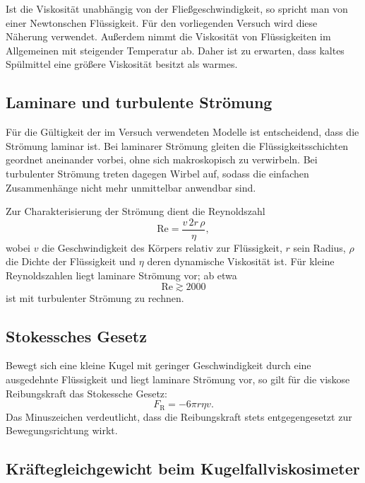 \documentclass{report}
\begin{document}
\noindent
Ist die Viskosität unabhängig von der Fließgeschwindigkeit, so spricht man von einer
Newtonschen Flüssigkeit. Für den vorliegenden Versuch wird diese Näherung verwendet.
Außerdem nimmt die Viskosität von Flüssigkeiten im Allgemeinen mit steigender Temperatur ab.
Daher ist zu erwarten, dass kaltes Spülmittel eine größere Viskosität besitzt als warmes.

\subsection{Laminare und turbulente Strömung}

Für die Gültigkeit der im Versuch verwendeten Modelle ist entscheidend, dass die Strömung
laminar ist. Bei laminarer Strömung gleiten die Flüssigkeitsschichten geordnet aneinander
vorbei, ohne sich makroskopisch zu verwirbeln. Bei turbulenter Strömung treten dagegen
Wirbel auf, sodass die einfachen Zusammenhänge nicht mehr unmittelbar anwendbar sind.

\noindent
Zur Charakterisierung der Strömung dient die Reynoldszahl
\begin{equation}
    \mathrm{Re} = \frac{v \, 2r \, \rho}{\eta},
\end{equation}
wobei $v$ die Geschwindigkeit des Körpers relativ zur Flüssigkeit, $r$ sein Radius,
$\rho$ die Dichte der Flüssigkeit und $\eta$ deren dynamische Viskosität ist.
Für kleine Reynoldszahlen liegt laminare Strömung vor; ab etwa
\begin{equation}
    \mathrm{Re} \gtrsim 2000
\end{equation}
ist mit turbulenter Strömung zu rechnen.

\subsection{Stokessches Gesetz}

Bewegt sich eine kleine Kugel mit geringer Geschwindigkeit durch eine ausgedehnte Flüssigkeit
und liegt laminare Strömung vor, so gilt für die viskose Reibungskraft das Stokessche Gesetz:
\begin{equation}
    F_\mathrm{R} = - 6 \pi r \eta v.
\end{equation}
Das Minuszeichen verdeutlicht, dass die Reibungskraft stets entgegengesetzt zur
Bewegungsrichtung wirkt.

\subsection{Kräftegleichgewicht beim Kugelfallviskosimeter}
\end{document}
